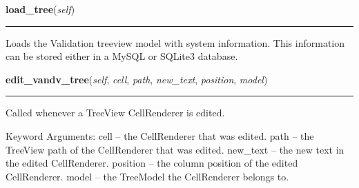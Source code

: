 \hspace{.8\funcindent}\begin{boxedminipage}{\funcwidth}

    \raggedright \textbf{load\_tree}(\textit{self})

    \vspace{-1.5ex}

    \rule{\textwidth}{0.5\fboxrule}
\setlength{\parskip}{2ex}
    Loads the Validation treeview model with system information. This 
    information can be stored either in a MySQL or SQLite3 database.

\setlength{\parskip}{1ex}
    \end{boxedminipage}

    \label{reliafree:validation:Validation:edit_vandv_tree}

    \vspace{0.5ex}

\hspace{.8\funcindent}\begin{boxedminipage}{\funcwidth}

    \raggedright \textbf{edit\_vandv\_tree}(\textit{self}, \textit{cell}, \textit{path}, \textit{new\_text}, \textit{position}, \textit{model})

    \vspace{-1.5ex}

    \rule{\textwidth}{0.5\fboxrule}
\setlength{\parskip}{2ex}
    Called whenever a TreeView CellRenderer is edited.

    Keyword Arguments: cell     -- the CellRenderer that was edited. path
    -- the TreeView path of the CellRenderer that was edited. new\_text -- 
    the new text in the edited CellRenderer. position -- the column 
    position of the edited CellRenderer. model    -- the TreeModel the 
    CellRenderer belongs to.

\setlength{\parskip}{1ex}
    \end{boxedminipage}

    \label{reliafree:validation:Validation:add_task}

    \vspace{0.5ex}

